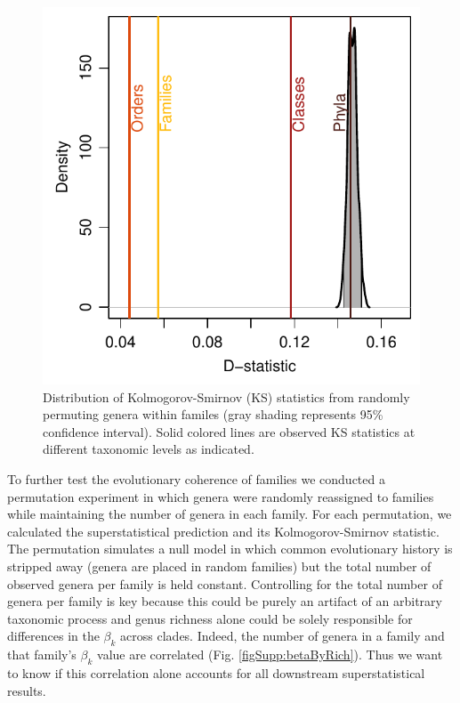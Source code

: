 \documentclass[12pt]{article}
\let\citep=\cite
\begin{document}
\begin{figure}[!h]
  \centering
  \includegraphics[scale=1]{../../fig_dStat.pdf}
  \caption[Goodness of superstatistical theory fit]{Distribution of
    Kolmogorov-Smirnov (KS) statistics from randomly permuting genera
    within familes (gray shading represents 95\% confidence
    interval). Solid colored lines are observed KS statistics at
    different taxonomic levels as indicated.}
  \label{fig:dStat}
\end{figure}

To further test the evolutionary coherence of families we conducted a
permutation experiment in which genera were randomly reassigned to
families while maintaining the number of genera in each family. For
each permutation, we calculated the superstatistical prediction and
its Kolmogorov-Smirnov statistic. The permutation simulates a null
model in which common evolutionary history is stripped away (genera
are placed in random families) but the total number of observed genera
per family is held constant. Controlling for the total number of
genera per family is key because this could be purely an artifact of
an arbitrary taxonomic process \citep{yule1925, capocci2008} and genus
richness alone could be solely responsible for differences in the
$\beta_k$ across clades. Indeed, the number of genera in a family and
that family's $\beta_k$ value are correlated
(Fig. \ref{figSupp:betaByRich}). Thus we want to know if this
correlation alone accounts for all downstream superstatistical
results.
\end{document}
